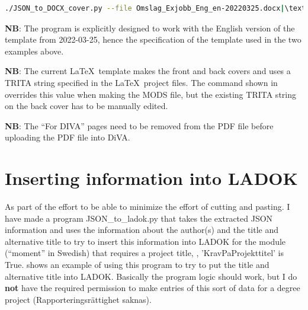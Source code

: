 \begin{lstlisting}[escapechar=|, basicstyle=\footnotesize, language={bash}, caption={Command to make a cover DOCX file with the specified values}, label=lst:JSONtoDOCXcover2]
./JSON_to_DOCX_cover.py --file Omslag_Exjobb_Eng_en-20220325.docx|\textbackslash \\| --cycle 2 --credits 30.0 --area "bioteknik" --area2 "kemiteknik"|\textbackslash \\| --exam both --trita "TRITA-CBH-EX-2021:00"|\textbackslash \\| --language sv  --json calendar-sv.json
\end{lstlisting}

\textbf{NB}: The program is explicitly designed to work with the English version of the template from 2022-03-25, hence the specification of the template used in the two examples above.


\textbf{NB}: The current \LaTeX~template makes the front and back covers and uses a TRITA string specified in the \LaTeX~project files. The command shown in  overrides this value when making the MODS file, but the existing TRITA string on the back cover has to be manually edited.


\textbf{NB}: The ``For DIVA'' pages need to be removed from the PDF file before uploading the PDF file into DiVA.

\section[Inserting information into LADOK]{Inserting information into LADOK}
\label{sec:JSONtoLADOKDiVAAdmis}
As part of the effort to be able to minimize the effort of cutting and pasting. I have made a program JSON\_to\_ladok.py that takes the extracted JSON information and uses the information about the author(s) and the title and alternative title to try to insert this information into LADOK for the module (\ie ``moment'' in Swedish) that requires a project title, \ie, 'KravPaProjekttitel' is True.  shows an example of using this program to try to put the title and alternative title into LADOK. Basically the program logic should work, but I do \textbf{not} have the required permission to make entries of this sort of data for a degree project (\ie Rapporteringsrättighet saknas).


